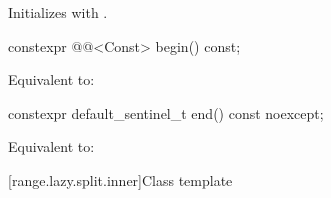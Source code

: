 \begin{itemdescr}
\pnum
\effects
Initializes  with .
\end{itemdescr}

%
\begin{itemdecl}
constexpr @@<Const> begin() const;
\end{itemdecl}

\begin{itemdescr}
\pnum
\effects
Equivalent to: 
\end{itemdescr}

%
\begin{itemdecl}
constexpr default_sentinel_t end() const noexcept;
\end{itemdecl}

\begin{itemdescr}
\pnum
\effects
Equivalent to: 
\end{itemdescr}

[range.lazy.split.inner]{Class template }

